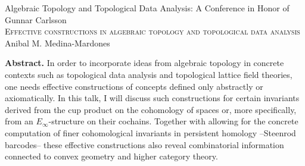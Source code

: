 \documentclass{article}
\begin{document}
	\pagestyle{empty}
	\begin{center}
		\large Algebraic Topology and Topological Data Analysis: A Conference in Honor of Gunnar Carlsson \\
		\vspace*{5pt}
		\Large\textsc{Effective constructions in algebraic topology and topological data analysis} \\
		\vspace*{10pt}
		\normalsize Anibal M. Medina-Mardones \\
	\end{center}
	\textbf{Abstract.} In order to incorporate ideas from algebraic topology in concrete contexts such as topological data analysis and topological lattice field theories, one needs effective constructions of concepts defined only abstractly or axiomatically.
	In this talk, I will discuss such constructions for certain invariants derived from the cup product on the cohomology of spaces or, more specifically, from an $E_\infty$-structure on their cochains.
	Together with allowing for the concrete computation of finer cohomological invariants in persistent homology --Steenrod barcodes-- these effective constructions also reveal combinatorial information connected to convex geometry and higher category theory.
\end{document}
